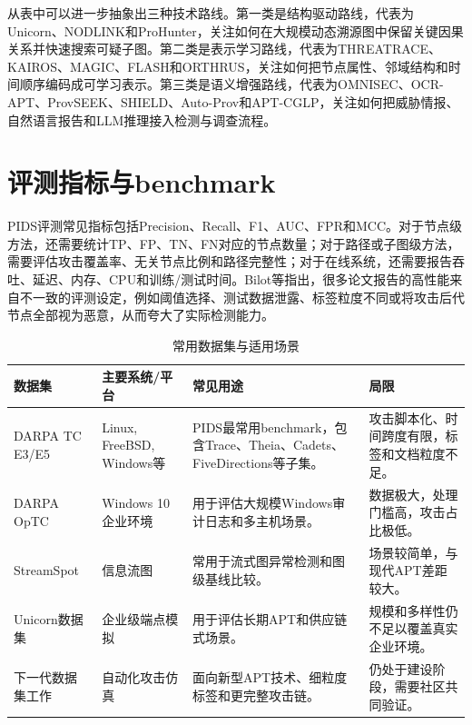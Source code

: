 从表中可以进一步抽象出三种技术路线。第一类是结构驱动路线，代表为Unicorn、NODLINK和ProHunter，关注如何在大规模动态溯源图中保留关键因果关系并快速搜索可疑子图\citep{prohunter2026}。第二类是表示学习路线，代表为THREATRACE、KAIROS、MAGIC、FLASH和ORTHRUS，关注如何把节点属性、邻域结构和时间顺序编码成可学习表示。第三类是语义增强路线，代表为OMNISEC、OCR-APT、ProvSEEK、SHIELD、Auto-Prov和APT-CGLP，关注如何把威胁情报、自然语言报告和LLM推理接入检测与调查流程\citep{provseek2025,shield2025,aptcglp2025,autoprov2026}。

\section{评测指标与benchmark}

PIDS评测常见指标包括Precision、Recall、F1、AUC、FPR和MCC。对于节点级方法，还需要统计TP、FP、TN、FN对应的节点数量；对于路径或子图级方法，需要评估攻击覆盖率、无关节点比例和路径完整性；对于在线系统，还需要报告吞吐、延迟、内存、CPU和训练/测试时间。Bilot等指出，很多论文报告的高性能来自不一致的评测设定，例如阈值选择、测试数据泄露、标签粒度不同或将攻击后代节点全部视为恶意，从而夸大了实际检测能力\citep{bilot2025simpler}。

\begin{table}[htbp]
    \centering
    \small
    \caption{常用数据集与适用场景}
    \label{tab:datasets}
    \renewcommand{\arraystretch}{1.18}
    \begin{tabularx}{\textwidth}{p{2.6cm} p{2.4cm} X X}
        \toprule
        数据集 & 主要系统/平台 & 常见用途 & 局限 \\
        \midrule
        DARPA TC E3/E5 & Linux, FreeBSD, Windows等 & PIDS最常用benchmark，包含Trace、Theia、Cadets、FiveDirections等子集。 & 攻击脚本化、时间跨度有限，标签和文档粒度不足。 \\
        DARPA OpTC & Windows 10企业环境 & 用于评估大规模Windows审计日志和多主机场景。 & 数据极大，处理门槛高，攻击占比极低。 \\
        StreamSpot & 信息流图 & 常用于流式图异常检测和图级基线比较。 & 场景较简单，与现代APT差距较大。 \\
        Unicorn数据集 & 企业级端点模拟 & 用于评估长期APT和供应链式场景。 & 规模和多样性仍不足以覆盖真实企业环境。 \\
        下一代数据集工作\citep{nextgendatasets2026} & 自动化攻击仿真 & 面向新型APT技术、细粒度标签和更完整攻击链。 & 仍处于建设阶段，需要社区共同验证。 \\
        \bottomrule
    \end{tabularx}
\end{table}

